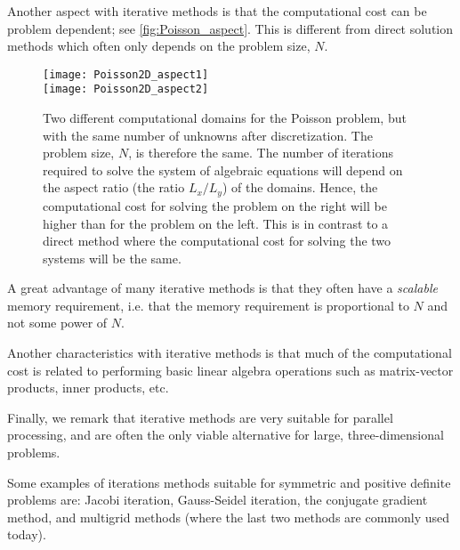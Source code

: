 Another aspect with iterative methods is that the computational cost can be
problem dependent; see \autoref{fig:Poisson_aspect}. This is different from
direct solution methods which often only depends on the problem size, $N$.

\begin{figure}[!ht]
  \centering
  \texttt{[image: Poisson2D\_aspect1]} \\
  \texttt{[image: Poisson2D\_aspect2]}
  \caption{
    Two different computational domains for the Poisson problem, but with the
    same number of unknowns after discretization. The problem size, $N$, is
    therefore the same. The number of iterations required to solve the system of
    algebraic equations will depend on the aspect ratio (the ratio $L_x/L_y$) of
    the domains. Hence, the computational cost for solving the problem on the
    right will be higher than for the problem on the left. This is in contrast
    to a direct method where the computational cost for solving the two systems
    will be the same.
  }
  \label{fig:Poisson_aspect}
\end{figure}

A great advantage of many iterative methods is that they often have a
\emph{scalable} memory requirement, i.e. that the memory requirement is
proportional to $N$ and not some power of $N$.

Another characteristics with iterative methods is that much of the computational
cost is related to performing basic linear algebra operations such as
matrix-vector products, inner products, etc.

Finally, we remark that iterative methods are very suitable for parallel
processing, and are often the only viable alternative for large,
three-dimensional problems.

Some examples of iterations methods suitable for symmetric and positive definite
problems are: Jacobi iteration, Gauss-Seidel iteration, the conjugate gradient
method, and multigrid methods (where the last two methods are commonly used
today).
